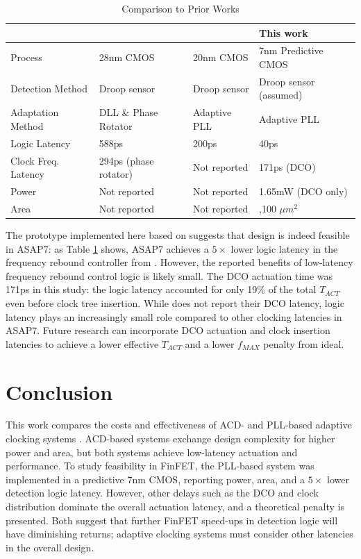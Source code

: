 \documentclass[twoside,9pt,journal,letterpage]{IEEEtran}
\begin{document}
\begin{table}[!ht]
\caption{Comparison to Prior Works} 
\label{table:comparison}
\centering
\begin{tabularx}{\columnwidth}{
	| >{\centering\arraybackslash}X 
	| >{\centering\arraybackslash}X 
	| >{\centering\arraybackslash}X 
	| >{\centering\arraybackslash}X | }
	\hline
	& \cite{wilcox2015} & \cite{hashimoto2018} & This work \\
	\hline
	Process & 28nm CMOS & 20nm CMOS & 7nm Predictive CMOS  \\
	\hline
	Detection Method & Droop sensor & Droop sensor & Droop sensor (assumed)  \\
	\hline
	Adaptation Method & DLL \& Phase Rotator & Adaptive PLL & Adaptive PLL  \\
	\hline
	Logic Latency & 588ps & 200ps & 40ps  \\
	\hline
	Clock Freq. Latency & 294ps (phase rotator) & Not reported & 171ps (DCO)  \\
	\hline
	Power & Not reported & Not reported & 1.65mW (DCO only) \\
	\hline
	Area & Not reported & Not reported & 10,100 $\mu m^2$ \\
	\hline
\end{tabularx}
\end{table}

The prototype implemented here based on \cite{hashimoto2018} suggests that design is indeed feasible in ASAP7: as Table \ref{table:comparison} shows, ASAP7 achieves a $5\times$ lower logic latency in the frequency rebound controller from \cite{hashimoto2018}. However, the reported benefits of low-latency frequency rebound control logic is likely small. The DCO actuation time was 171ps in this study: the logic latency accounted for only 19\% of the total $T_{ACT}$ even before clock tree insertion. While \cite{hashimoto2018} does not report their DCO latency, logic latency plays an increasingly small role compared to other clocking latencies in ASAP7. Future research can incorporate DCO actuation and clock insertion latencies to achieve a lower effective $T_{ACT}$ and a lower $f_{MAX}$ penalty from ideal.

\vspace{-5pt}
\section{Conclusion}
\label{sec:conclusion}

This work compares the costs and effectiveness of ACD- and PLL-based adaptive clocking systems \cite{hashimoto2018,wilcox2015}. ACD-based systems exchange design complexity for higher power and area, but both systems achieve low-latency actuation and performance. To study feasibility in FinFET, the PLL-based system was implemented in a predictive 7nm CMOS, reporting power, area, and a $5\times$ lower detection logic latency. However, other delays such as the DCO and clock distribution dominate the overall actuation latency, and a theoretical penalty is presented. Both suggest that further FinFET speed-ups in detection logic will have diminishing returns; adaptive clocking systems must consider other latencies in the overall design. 

\vspace{-5pt}

\begingroup
\raggedright

\endgroup
\end{document}
